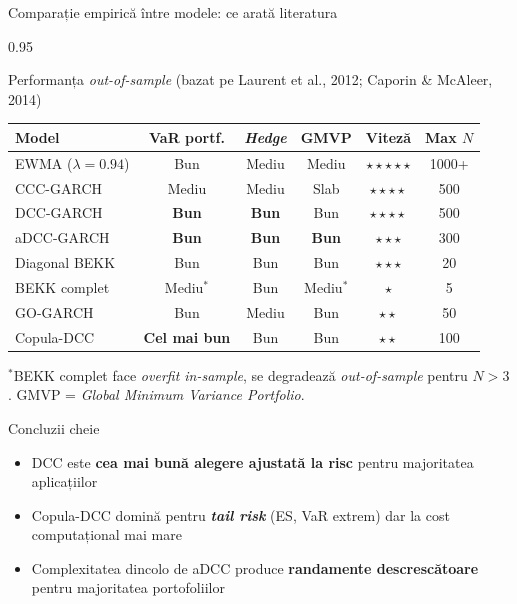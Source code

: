 \documentclass[9pt, aspectratio=169, t]{beamer}
\begin{document}
\begin{frame}{Comparație empirică între modele: ce arată literatura}
    \begin{cminipage}{0.95\textwidth}
    \vspace{-3mm}
    {\scriptsize
    \begin{block}{Performanța \textit{out-of-sample} (bazat pe Laurent et al., 2012; Caporin \& McAleer, 2014)}
        \vspace{-1mm}
        \begin{center}
        \begin{tabular}{lccccc}
            \hline
            \textbf{Model} & \textbf{VaR portf.} & \textbf{\textit{Hedge}} & \textbf{GMVP} & \textbf{Viteză} & \textbf{Max $N$} \\
            \hline
            EWMA ($\lambda\!=\!0.94$) & Bun & Mediu & Mediu & $\star\star\star\star\star$ & 1000+ \\
            CCC-GARCH & Mediu & Mediu & Slab & $\star\star\star\star$ & 500 \\
            DCC-GARCH & \textbf{Bun} & \textbf{Bun} & Bun & $\star\star\star\star$ & 500 \\
            aDCC-GARCH & \textbf{Bun} & \textbf{Bun} & \textbf{Bun} & $\star\star\star$ & 300 \\
            Diagonal BEKK & Bun & Bun & Bun & $\star\star\star$ & 20 \\
            BEKK complet & Mediu$^*$ & Bun & Mediu$^*$ & $\star$ & 5 \\
            GO-GARCH & Bun & Mediu & Bun & $\star\star$ & 50 \\
            Copula-DCC & \textbf{Cel mai bun} & Bun & Bun & $\star\star$ & 100 \\
            \hline
        \end{tabular}
        \end{center}
        \vspace{-2mm}
        $^*$BEKK complet face \textit{overfit in-sample}, se degradează \textit{out-of-sample} pentru $N > 3$. GMVP = \textit{Global Minimum Variance Portfolio}.
    \end{block}
    \vspace{-2mm}
    \begin{alertblock}{Concluzii cheie}
        \begin{itemize}\setlength{\itemsep}{0pt}
            \item DCC este \textbf{cea mai bună alegere ajustată la risc} pentru majoritatea aplicațiilor
            \item Copula-DCC domină pentru \textbf{\textit{tail risk}} (ES, VaR extrem) dar la cost computațional mai mare
            \item Complexitatea dincolo de aDCC produce \textbf{randamente descrescătoare} pentru majoritatea portofoliilor
        \end{itemize}
    \end{alertblock}
    }
    \end{cminipage}
\end{frame}
\end{document}
